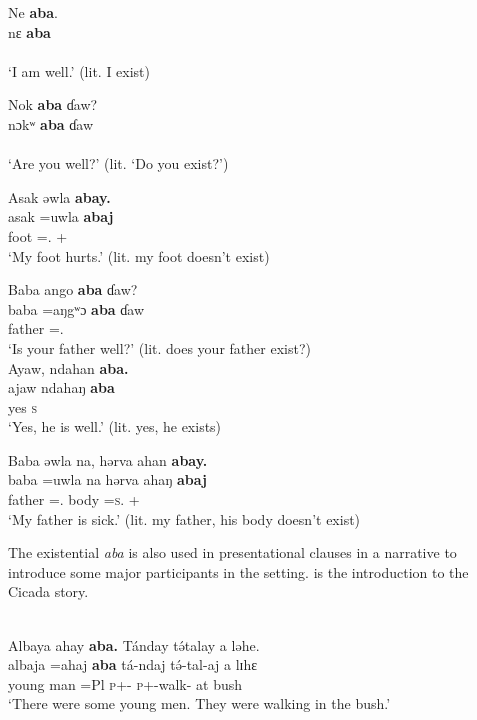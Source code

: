 \medskip
\ex
Ne \textbf{aba}. \\
\gll nɛ \textbf{aba} \\
     {\oneS} \EXT \\
\glt ‘I am well.’ (lit. I exist)\\
\z\z

\ea \label{ex:3:90}
Nok \textbf{aba}  ɗaw?\\
\gll  nɔkʷ  \textbf{aba}    ɗaw\\
      {\twoS}    {\EXT}    {\QUEST}\\
\glt  ‘Are you well?’ (lit. ‘Do you exist?’)
\z

\ea \label{ex:3:91}
Asak  əwla  \textbf{abay.}\\
\gll  asak    =uwla    \textbf{abaj}\\
      foot    ={\oneS}.{\POSS}  {\EXT}+{\NEG}\\
\glt  ‘My foot hurts.’ (lit. my foot doesn’t exist)
\z

\ea \label{ex:3:92}
\ea Baba  ango \textbf{aba} ɗaw?  \\
\gll baba   =aŋgʷɔ     \textbf{aba}   ɗaw   \\
      father  ={\twoS}.{\POSS}  {\EXT}  {\QUEST}   \\
\glt ‘Is your father well?’  (lit. does your father exist?)  \\

\medskip
 \ex
Ayaw,  ndahan \textbf{aba.}\\
 \gll ajaw   ndahaŋ  \textbf{aba}\\
      yes  \textsc{s}  {\EXT}\\ 
 \glt ‘Yes, he is well.’ (lit. yes, he exists)\\
\z\z

\ea \label{ex:3:93} 
Baba  əwla  na,  hərva  ahan \textbf{abay.}\\
\gll baba    =uwla      na  hərva  ahaŋ      \textbf{abaj}\\
      father  ={\oneS}.{\POSS}  {\PSP}  body  =\textsc{s}.{\POSS}    {\EXT}+{\NEG}\\
\glt ‘My father is sick.’ (lit. my father, his body doesn’t exist)
\z

The existential \textit{aba} is also used in presentational clauses in a narrative to introduce some major participants in the setting.  is the introduction to the Cicada story. 

\ea \label{ex:3:94}\\
Albaya  ahay  \textbf{aba.}  Tánday  t\'{ə}talay  a  ləhe.\\
\gll  albaja  =ahaj  \textbf{aba}  tá-ndaj    t\'{ə}-tal-aj    a  lɪhɛ\\
      {young man}   =Pl  {\EXT}  \textsc{p}+{\IFV}-{\PRG}     \textsc{p}+{\IFV}-walk-{\CL}  at    bush\\
\glt  ‘There were some young men. They were walking in the bush.’
\z

